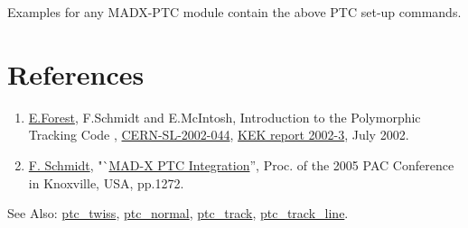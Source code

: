  Examples for any MADX-PTC module contain the above PTC set-up commands. 


\section{References}

\begin{enumerate}
   \item \href{E.Forest}{E.Forest}, F.Schmidt and E.McIntosh,
     Introduction to the Polymorphic Tracking Code ,
     \href{http://cern.ch/madx/doc/sl-2002-044.pdf}{CERN-SL-2002-044},
     \href{http://ccdb4fs.kek.jp/cgi-bin/img/allpdf?200302020}{KEK
       report 2002-3}, July 2002. 
   \item \href{F.Schmidt}{F. Schmidt},
     "`\href{http://cern.ch/madx/doc/MPPE012.pdf}{MAD-X PTC
     Integration}'', Proc. of the 2005 PAC Conference in
     Knoxville, USA, pp.1272. 
\end{enumerate}


See Also: 
    \href{../ptc_twiss/ptc_twiss.html}{ptc\_twiss},
    \href{../ptc_normal/ptc_normal.html}{ptc\_normal},
    \href{../ptc_track/ptc_track.html}{ ptc\_track},
    \href{../ptc_track_line/ptc_track_line.html}{ptc\_track\_line}. 




